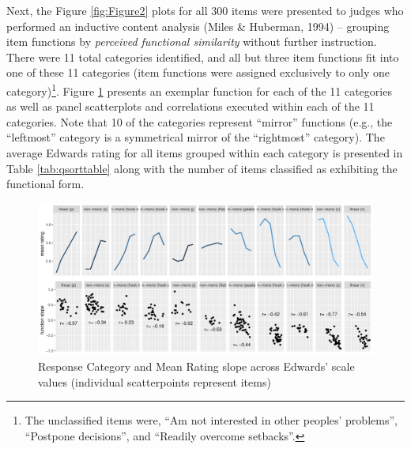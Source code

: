 \documentclass[
  ,jou]{apa6}
\begin{document}
Next, the Figure \ref{fig:Figure2} plots for all 300 items were presented to judges who performed an inductive content analysis (Miles \& Huberman, 1994) -- grouping item functions by \emph{perceived functional similarity} without further instruction. There were 11 total categories identified, and all but three item functions fit into one of these 11 categories (item functions were assigned exclusively to only one category)\footnote{The unclassified items were, ``Am not interested in other peoples' problems'', ``Postpone decisions'', and ``Readily overcome setbacks''.}. Figure \ref{fig:lastone} presents an exemplar function for each of the 11 categories as well as panel scatterplots and correlations executed within each of the 11 categories. Note that 10 of the categories represent ``mirror'' functions (e.g., the ``leftmost'' category is a symmetrical mirror of the ``rightmost'' category). The average Edwards rating for all items grouped within each category is presented in Table \ref{tab:qsorttable} along with the number of items classified as exhibiting the functional form.

\begin{figure}
\centering
\includegraphics{FullStudy_files/figure-latex/lastone-1.pdf}
\caption{\label{fig:lastone}Response Category and Mean Rating slope across Edwards' scale values (individual scatterpoints represent items)}
\end{figure}
\end{document}
